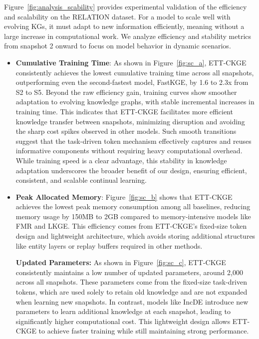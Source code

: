 \documentclass[runningheads]{llncs}
\begin{document}
Figure~\ref{fig:analysis_scability} provides experimental validation of the efficiency and scalability on the RELATION dataset. For a model to scale well with evolving KGs, it must adapt to new information efficiently, meaning without a large increase in computational work. We analyze efficiency and stability metrics from snapshot 2 onward to focus on model behavior in dynamic scenarios.

\begin{itemize}[label=\textbullet]
    \item \textbf{Cumulative Training Time}: As shown in Figure~\ref{fig:sc_a}, ETT-CKGE consistently achieves the lowest cumulative training time across all snapshots, outperforming even the second-fastest model, FastKGE, by 1.6 to 2.3x from S2 to S5. Beyond the raw efficiency gain, training curves show smoother adaptation to evolving knowledge graphs, with stable incremental increases in training time. This indicates that ETT-CKGE facilitates more efficient knowledge transfer between snapshots, minimizing disruption and avoiding the sharp cost spikes observed in other models. Such smooth transitions suggest that the task-driven token mechanism effectively captures and reuses informative components without requiring heavy computational overhead. While training speed is a clear advantage, this stability in knowledge adaptation underscores the broader benefit of our design, ensuring efficient, consistent, and scalable continual learning.

    \item \textbf{Peak Allocated Memory}: Figure~\ref{fig:sc_b} shows that ETT-CKGE achieves the lowest peak memory consumption among all baselines, reducing memory usage by 150MB to 2GB compared to memory-intensive models like FMR and LKGE. This efficiency comes from ETT-CKGE’s fixed-size token design and lightweight architecture, which avoids storing additional structures like entity layers or replay buffers required in other methods. 

    \textbf{Updated Parameters:} As shown in Figure~\ref{fig:sc_c}, ETT-CKGE consistently maintains a low number of updated parameters, around 2,000 across all snapshots. These parameters come from the fixed-size task-driven tokens, which are used solely to retain old knowledge and are not expanded when learning new snapshots. In contrast, models like IncDE introduce new parameters to learn additional knowledge at each snapshot, leading to significantly higher computational cost. This lightweight design allows ETT-CKGE to achieve faster training while still maintaining strong performance.
    
\end{itemize}

\end{document}
